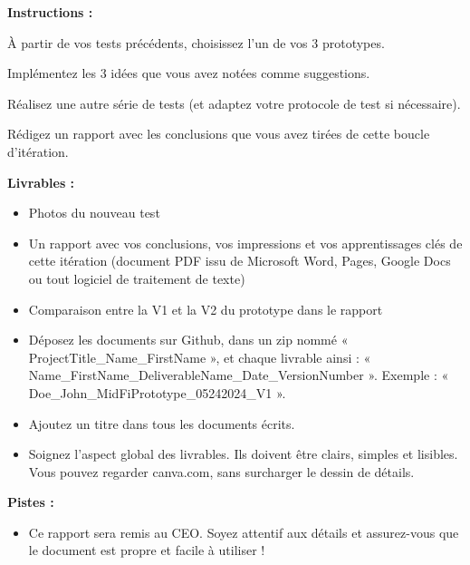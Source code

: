 \makeheaderfiles

\textbf{Instructions :}

À partir de vos tests précédents, choisissez l'un de vos 3 prototypes.

Implémentez les 3 idées que vous avez notées comme suggestions.

Réalisez une autre série de tests (et adaptez votre protocole de test si nécessaire).

Rédigez un rapport avec les conclusions que vous avez tirées de cette boucle d'itération.

\textbf{Livrables :}

\begin{itemize}
\item Photos du nouveau test
\item Un rapport avec vos conclusions, vos impressions et vos apprentissages clés de cette itération (document PDF issu de Microsoft Word, Pages, Google Docs ou tout logiciel de traitement de texte)
\item Comparaison entre la V1 et la V2 du prototype dans le rapport
\item Déposez les documents sur Github, dans un zip nommé « ProjectTitle\_Name\_FirstName », et chaque livrable ainsi : « Name\_FirstName\_DeliverableName\_Date\_VersionNumber ». Exemple : « Doe\_John\_MidFiPrototype\_05242024\_V1 ».
\item Ajoutez un titre dans tous les documents écrits.
\item Soignez l'aspect global des livrables. Ils doivent être clairs, simples et lisibles. Vous pouvez regarder canva.com, sans surcharger le dessin de détails.
\end{itemize}

\textbf{Pistes :}

\begin{itemize}
\item Ce rapport sera remis au CEO. Soyez attentif aux détails et assurez-vous que le document est propre et facile à utiliser !
\end{itemize}

